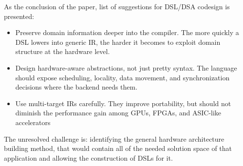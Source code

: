 \documentclass[conference]{IEEEtran}
\begin{document}
As the conclusion of the paper, list of suggestions for DSL/DSA codesign is presented:

\begin{itemize}
  \item Preserve domain information deeper into the compiler. The more quickly a DSL lowers into generic IR, the harder it becomes to exploit domain structure at the hardware level.
  \item Design hardware-aware abstractions, not just pretty syntax. The language should expose scheduling, locality, data movement, and synchronization decisions where the backend needs them.
  \item Use multi-target IRs carefully. They improve portability, but should not diminish the performance gain among GPUs, FPGAs, and ASIC-like accelerators 
\end{itemize}

The unresolved challenge is: identifying the general hardware architecture building method, that would contain all of the needed solution space of that application and allowing the construction of DSLs for it.

\end{document}
